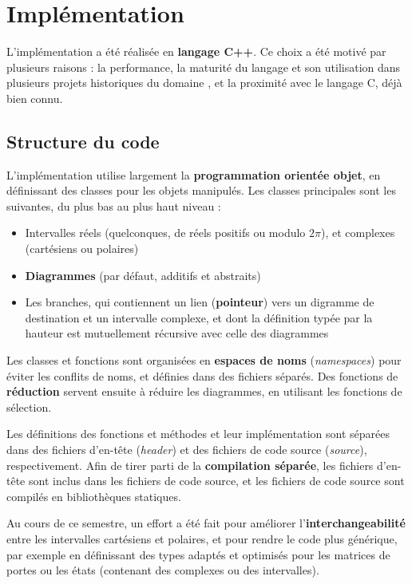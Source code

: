 \chapter{Implémentation}
\label{ch:Implementation}

L’implémentation a été réalisée en \textbf{langage C++}. Ce choix a été motivé par plusieurs raisons : la performance, la maturité du langage et son utilisation dans plusieurs projets historiques du domaine \cite{Bichsel_2023} \cite{QTranslator}, et la proximité avec le langage C, déjà bien connu.

\section{Structure du code}

L'implémentation utilise largement la \textbf{programmation orientée objet}, en définissant des classes pour les objets manipulés. Les classes principales sont les suivantes, du plus bas au plus haut niveau :
\begin{itemize}
  \item Intervalles réels (quelconques, de réels positifs ou modulo $2\pi$), et complexes (cartésiens ou polaires)
  \item \textbf{Diagrammes} (par défaut, additifs et abstraits)
  \item Les branches, qui contiennent un lien (\textbf{pointeur}) vers un digramme de destination et un intervalle complexe, et dont la définition typée par la hauteur est mutuellement récursive avec celle des diagrammes
\end{itemize}

Les classes et fonctions sont organisées en \textbf{espaces de noms} (\textit{namespaces}) pour éviter les conflits de noms, et définies dans des fichiers séparés. Des fonctions de \textbf{réduction} servent ensuite à réduire les diagrammes, en utilisant les fonctions de sélection.

Les définitions des fonctions et méthodes et leur implémentation sont séparées dans des fichiers d'en-tête (\textit{header}) et des fichiers de code source (\textit{source}), respectivement. Afin de tirer parti de la \textbf{compilation séparée}, les fichiers d'en-tête sont inclus dans les fichiers de code source, et les fichiers de code source sont compilés en bibliothèques statiques.

Au cours de ce semestre, un effort a été fait pour améliorer l'\textbf{interchangeabilité} entre les intervalles cartésiens et polaires, et pour rendre le code plus générique, par exemple en définissant des types adaptés et optimisés pour les matrices de portes ou les états (contenant des complexes ou des intervalles).

